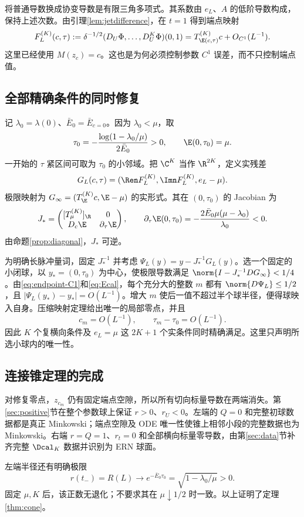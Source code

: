 将普通导数换成协变导数是有限三角多项式。其系数由 $e_L$、$A$ 的低阶导数构成，保持上述次数。由引理\ref{lem:jetdifference}，在 $t=1$ 得到端点映射
\begin{equation}\label{eq:endpoint-C1}
F_L^{(K)}(c,\tau):=
\delta^{-1/2}(D_U\Phi,\ldots,D_U^K\Phi)(0,1)
=T_{\E(c,\tau)}^{(K)}c+O_{C^1}(L^{-1}).
\end{equation}
这里已经使用 $M(z_c)=c$。这也是为何必须控制参数 $C^1$ 误差，而不只控制端点值。

\subsection{全部精确条件的同时修复}
记 $\lambda_0=\lambda(0)$、$\bar E_0=\bar E_{c=0}$。因为 $\lambda_0<\mu$，取
\begin{equation}\label{eq:tauzero}
\tau_0=-\frac{\log(1-\lambda_0/\mu)}{2\bar E_0}>0,
\qquad\E(0,\tau_0)=\mu.
\end{equation}
一开始的 $\tau$ 紧区间可取为 $\tau_0$ 的小邻域。把 $\C^K$ 当作 $\R^{2K}$，定义实残差
\[
G_L(c,\tau)=(\Ren F_L^{(K)},\Imn F_L^{(K)},e_L-\mu).
\]
极限映射为 $G_\infty=(T_{\E}^{(K)}c,\E-\mu)$ 的实形式。其在 $(0,\tau_0)$ 的 Jacobian 为
\begin{equation}\label{eq:jacobian}
J_*=
\begin{pmatrix}
[T_\mu^{(K)}]_{\R}&0\\
D_c\E&\partial_\tau\E
\end{pmatrix},\qquad
\partial_\tau\E(0,\tau_0)
=-\frac{2\bar E_0\mu(\mu-\lambda_0)}{\lambda_0}<0.
\end{equation}
由命题\ref{prop:diagonal}，$J_*$ 可逆。

为明确长脉冲量词，固定 $J_*^{-1}$ 并考虑
$\Psi_L(y)=y-J_*^{-1}G_L(y)$。选一个固定的小闭球，以 $y_*=(0,\tau_0)$ 为中心，使极限导数满足 $\norm{I-J_*^{-1}DG_\infty}<1/4$。由\eqref{eq:endpoint-C1}和\eqref{eq:Ecal}，每个充分大的整数 $m$ 都有 $\norm{D\Psi_L}\le1/2$，且 $|\Psi_L(y_*)-y_*|=O(L^{-1})$。增大 $m$ 使后一值不超过半个球半径，便得球映入自身。压缩映射定理给出唯一的局部零点，并且
\begin{equation}\label{eq:root}
c_m=O(L^{-1}),\qquad \tau_m-\tau_0=O(L^{-1}).
\end{equation}
因此 $K$ 个复横向条件及 $e_L=\mu$ 这 $2K+1$ 个实条件同时精确满足。这里只声明所选小球内的唯一性。

\subsection{连接锥定理的完成}
对修复零点，$z_{c_m}$ 仍有固定端点空隙，所以所有切向标量导数在两端消失。第\ref{sec:positive}节在整个参数球上保证 $r>0$、$r_U<0$。左端的 $Q=0$ 和完整初球数据都是真正 Minkowski；端点空隙及 ODE 唯一性使锥上相邻小段的完整数据也为 Minkowski。右端 $r=Q=1$、$r_t=0$ 和全部横向标量零导数，由第\ref{sec:data}节补齐完整 $\Dcal_K$ 数据并识别为 ERN 球面。

左端半径还有明确极限
\begin{equation}\label{eq:left-radius}
r(t_-)=R(L)\longrightarrow e^{-\bar E_0\tau_0}
=\sqrt{1-\lambda_0/\mu}>0.
\end{equation}
固定 $\mu,K$ 后，该正数无退化；不要求其在 $\mu\downarrow1/2$ 时一致。以上证明了定理\ref{thm:cone}。
